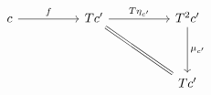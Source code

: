 \[\begin{tikzcd}
	c && {Tc'} && {T^{2}c'} \\
	\\
	&&&& {Tc'}
	\arrow["f", from=1-1, to=1-3]
	\arrow["{T\eta_{c'}}", from=1-3, to=1-5]
	\arrow["{\mu_{c'}}", from=1-5, to=3-5]
	\arrow[Rightarrow, no head, from=1-3, to=3-5]
\end{tikzcd}\]